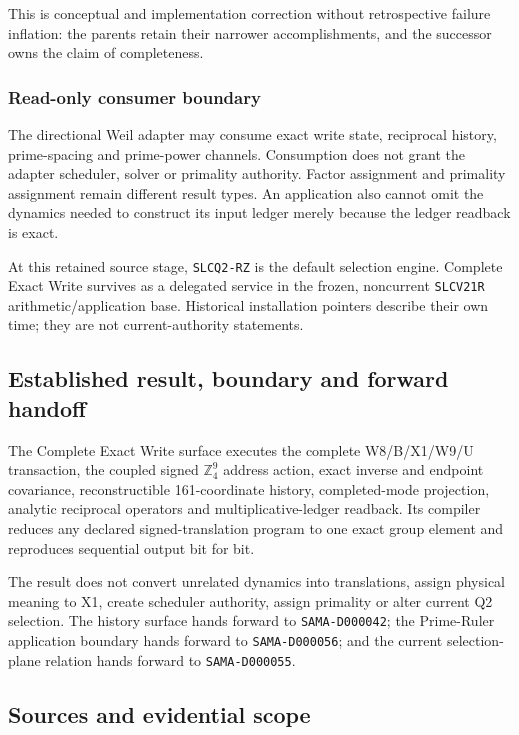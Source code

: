 This is conceptual and implementation correction without retrospective
failure inflation: the parents retain their narrower accomplishments,
and the successor owns the claim of completeness.

\subsubsection{Read-only consumer
boundary}\label{viii-ch04-read-only-consumer-boundary}

The directional Weil adapter may consume exact write state, reciprocal
history, prime-spacing and prime-power channels. Consumption does not
grant the adapter scheduler, solver or primality authority. Factor
assignment and primality assignment remain different result types. An
application also cannot omit the dynamics needed to construct its input
ledger merely because the ledger readback is exact.

At this retained source stage, \texttt{SLCQ2-RZ} is the default selection engine.
Complete Exact Write survives as a delegated service in the frozen,
noncurrent \texttt{SLCV21R} arithmetic/application base. Historical
installation pointers describe their own time; they are not
current-authority statements.

\subsection{Established result, boundary and forward
handoff}\label{viii-ch04-established-result-boundary-and-forward-handoff}

The Complete Exact Write surface executes the complete W8/B/X1/W9/U
transaction, the coupled signed \(\mathbb Z_4^9\) address action, exact
inverse and endpoint covariance, reconstructible 161-coordinate history,
completed-mode projection, analytic reciprocal operators and
multiplicative-ledger readback. Its compiler reduces any declared
signed-translation program to one exact group element and reproduces
sequential output bit for bit.

The result does not convert unrelated dynamics into translations, assign
physical meaning to X1, create scheduler authority, assign primality or
alter current Q2 selection. The history surface hands forward to
\texttt{SAMA-D000042}; the Prime-Ruler application boundary hands
forward to \texttt{SAMA-D000056}; and the current selection-plane
relation hands forward to \texttt{SAMA-D000055}.

\subsection{Sources and evidential
scope}\label{viii-ch04-sources-and-evidential-scope}

